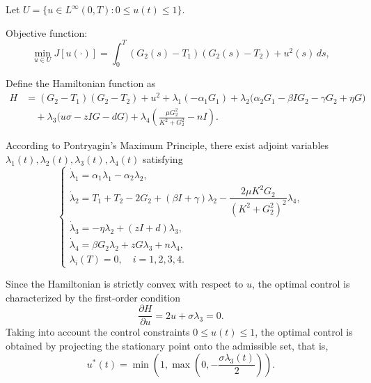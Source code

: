\documentclass[a4paper,fleqn]{cas-sc}
\numberwithin{equation}{section}
\numberwithin{equation}{section}
\newcommand{\1}{\boldsymbol{1}}
\newcommand{\0}{\boldsymbol{0}}
\begin{document}
Let $U = \{u \in L^\infty(0,T): 0 \le u(t) \le 1\}$.

Objective function:
\[
\underset{u \in U}{\min} J[u(\cdot)] = \int_0^T (G_2(s) - T_1)(G_2(s)-T_2) + u^2(s)\, ds,
\]

Define the Hamiltonian function as
\[
\begin{aligned}
H &= (G_2 - T_1)(G_2 - T_2) + u^2 + \lambda_1(-\alpha_1 G_1) + \lambda_2\big(\alpha_2 G_1 - \beta I G_2 - \gamma G_2 + \eta G\big) \\
& \quad + \lambda_3\big(u\sigma - z I G - d G\big) + \lambda_4\left(\frac{\mu G_2^2}{K^2 + G_2^2} - n I\right).
\end{aligned}
\]

According to Pontryagin's Maximum Principle, there exist adjoint variables \(\lambda_1(t), \lambda_2(t), \lambda_3(t), \lambda_4(t)\) satisfying
\[
\begin{cases}
\dot{\lambda}_1 
= \alpha_1 \lambda_1 - \alpha_2 \lambda_2, \\

\dot{\lambda}_2 
= T_1 + T_2 - 2G_2
+ (\beta I + \gamma)\lambda_2
- \dfrac{2\mu K^2 G_2}{(K^2 + G_2^2)^2}\lambda_4, \\

\dot{\lambda}_3 
= -\eta \lambda_2 + (zI + d)\lambda_3, \\

\dot{\lambda}_4 
= \beta G_2 \lambda_2 + zG \lambda_3 + n\lambda_4, \\
\lambda_i(T) = 0, \quad i=1,2,3,4.
\end{cases}
\]

Since the Hamiltonian is strictly convex with respect to \(u\), the optimal control is characterized by the first-order condition
\[
\frac{\partial H}{\partial u} = 2u + \sigma \lambda_3 = 0.
\]
Taking into account the control constraints \(0 \le u(t) \le 1\), the optimal control is obtained by projecting the stationary point onto the admissible set, that is,
\[
u^*(t) = \min\left(1, \max\left(0, -\frac{\sigma\lambda_3(t)}{2}\right)\right).
\]
\end{document}
